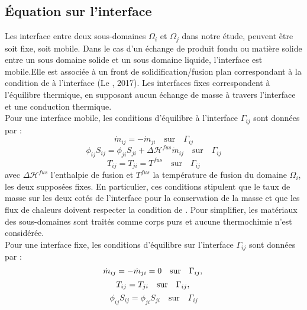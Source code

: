 \documentclass[11pt,a4paper]{scrartcl}%
\newcommand{\mtext}[1]{\quad\text{#1}\quad}%
\begin{document}
	\subsection{Équation sur l'interface}
	Les interface entre deux sous-domaines $\Omega_i$ et $\Omega_j$ dans notre étude, peuvent être soit fixe, soit mobile. Dans le cas d'un échange de produit fondu ou matière solide entre un sous domaine solide et un sous domaine liquide, l'interface est mobile.Elle est associée à un front de solidification/fusion plan correspondant à la condition de  à l'interface (Le , 2017). Les interfaces fixes correspondent à l'équilibre thermique, en supposant aucun échange de masse à travers l'interface et une conduction thermique.\\
	Pour une interface mobile, les conditions d'équilibre à l'interface $\Gamma_{ij}$ sont données par :
	\begin{equation}\label{eq3}
	\dot{m}_{ij} = -\dot{m}_{ji} \mtext{sur} \Gamma_{ij}
	\end{equation}
	\begin{equation}\label{eq4}
	\phi_{ij}S_{ij} = \phi_{ji}S_{ji} + \Delta\mathcal{H}^{fus}\dot{m}_{ij} \mtext{sur} \Gamma_{ij}
	\end{equation}
	\begin{equation}\label{eq5}
	T_{ij} = T_{ji} = T^{fus} \mtext{sur} \Gamma_{ij}
	\end{equation}
	avec $\Delta\mathcal{H}^{fus}$ l'enthalpie de fusion et $T^{fus}$ la température de fusion du domaine $\Omega_i$, les deux supposées fixes. En particulier, ces conditions stipulent que le taux de masse sur les deux cotés de l'interface pour la conservation de la masse et que les flux de chaleurs doivent respecter la condition de . Pour simplifier, les matériaux des sous-domaines sont traités comme corps purs et aucune thermochimie n'est considérée. \\
	Pour une interface fixe, les conditions d'équilibre sur l'interface $\Gamma_{ij}$ sont données par :
	\begin{equation}\label{eq6}
	\dot{m}_{ij} = -\dot{m}_{ji} = 0 \mtext{sur} \Gamma_{ij},\\
	\end{equation}
	\begin{equation}\label{eq7}
	T_{ij} = T_{ji}  \mtext{sur} \Gamma_{ij},\\
	\end{equation}
	\begin{equation}\label{eq8}
	\phi_{ij}S_{ij} = \phi_{ji}S_{ji} \mtext{sur} \Gamma_{ij}
	\end{equation} 
\end{document}
